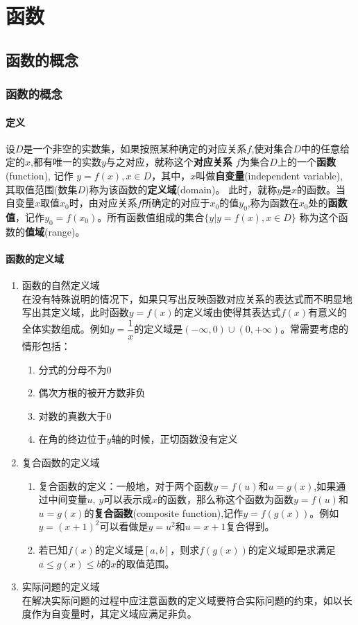 \chapter*{函数}
\section*{函数的概念}
\subsection*{函数的概念}
\subsubsection*{定义} 
设$D$是一个非空的实数集，如果按照某种确定的对应关系$f$,使对集合$D$中的任意给定的$x$,都有唯一的实数$y$与之对应，就称这个\textbf{对应关系} $f$为集合$D$上的一个\textbf{函数}(function), 记作 $y=f(x), x \in D$，其中，$x$叫做\textbf{自变量}(independent variable), 其取值范围(数集$D$)称为该函数的\textbf{定义域}(domain)。 此时，就称$y$是$x$的函数。当自变量$x$取值$x_0$时，由对应关系$f$所确定的对应于$x_0$的值$y_0$,称为函数在$x_0$处的\textbf{函数值}，记作$y_0=f(x_0)$。所有函数值组成的集合$\{y|y=f(x),x \in D\}$ 称为这个函数的\textbf{值域}(range)。

\subsubsection*{函数的定义域}
\begin{enumerate}
    \item 函数的自然定义域 \\
    在没有特殊说明的情况下，如果只写出反映函数对应关系的表达式而不明显地写出其定义域，此时函数$y=f(x)$的定义域由使得其表达式$f(x)$有意义的全体实数组成。例如$y=\dfrac{1}{x}$的定义域是$(-\infty, 0) \cup (0, +\infty)$。常需要考虑的情形包括：
    \begin{enumerate}
        \item 分式的分母不为0
        \item 偶次方根的被开方数非负
        \item 对数的真数大于0
        \item 在角的终边位于$y$轴的时候，正切函数没有定义
    \end{enumerate}
    \item 复合函数的定义域 
    \begin{enumerate}
        \item 复合函数的定义：一般地，对于两个函数$y=f(u)$和$u=g(x)$,如果通过中间变量$u$, $y$可以表示成$x$的函数，那么称这个函数为函数$y=f(u)$和$u=g(x)$的\textbf{复合函数}(composite function),记作$y=f(g(x))$。例如$y = (x+1)^2$可以看做是$y = u^2$和$u = x+1$复合得到。
        \item 若已知$f(x)$的定义域是$[a, b]$，则求$f(g(x))$的定义域即是求满足$a \leq g(x) \leq b$的$x$的取值范围。
    \end{enumerate}
    \item 实际问题的定义域 \\
    在解决实际问题的过程中应注意函数的定义域要符合实际问题的约束，如以长度作为自变量时，其定义域应满足非负。
\end{enumerate}

